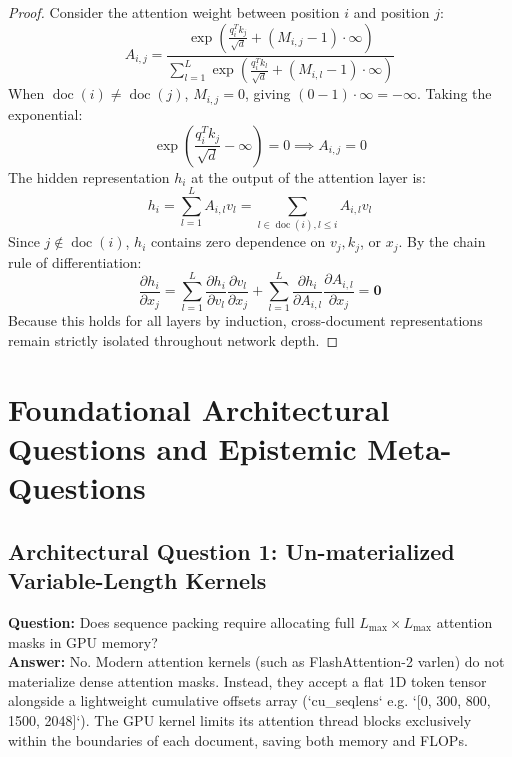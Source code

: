 \documentclass[11pt,a4paper]{article}
\theoremstyle{definition}
\begin{document}
\begin{proof}
Consider the attention weight between position $i$ and position $j$:
{\boldmath
\begin{equation}
A_{i, j} = \frac{\exp\left( \frac{q_i^T k_j}{\sqrt{d}} + (M_{i, j} - 1) \cdot \infty \right)}{\sum_{l=1}^L \exp\left( \frac{q_i^T k_l}{\sqrt{d}} + (M_{i, l} - 1) \cdot \infty \right)}
\end{equation}
}
When $\operatorname{doc}(i) \neq \operatorname{doc}(j)$, $M_{i, j} = 0$, giving $(0 - 1) \cdot \infty = -\infty$.
Taking the exponential:
{\boldmath
\begin{equation}
\exp\left( \frac{q_i^T k_j}{\sqrt{d}} - \infty \right) = 0 \implies A_{i, j} = 0
\end{equation}
}
The hidden representation $h_i$ at the output of the attention layer is:
{\boldmath
\begin{equation}
h_i = \sum_{l=1}^L A_{i, l} v_l = \sum_{l \in \operatorname{doc}(i), l \le i} A_{i, l} v_l
\end{equation}
}
Since $j \notin \operatorname{doc}(i)$, $h_i$ contains zero dependence on $v_j, k_j$, or $x_j$.
By the chain rule of differentiation:
{\boldmath
\begin{equation}
\frac{\partial h_i}{\partial x_j} = \sum_{l=1}^L \frac{\partial h_i}{\partial v_l} \frac{\partial v_l}{\partial x_j} + \sum_{l=1}^L \frac{\partial h_i}{\partial A_{i, l}} \frac{\partial A_{i, l}}{\partial x_j} = \mathbf{0}
\end{equation}
}
Because this holds for all layers by induction, cross-document representations remain strictly isolated throughout network depth.
\end{proof}

\section{Foundational Architectural Questions and Epistemic Meta-Questions}

\subsection{Architectural Question 1: Un-materialized Variable-Length Kernels}
\textbf{Question:} Does sequence packing require allocating full $L_{\max} \times L_{\max}$ attention masks in GPU memory?\\
\textbf{Answer:} No. Modern attention kernels (such as FlashAttention-2 varlen) do not materialize dense attention masks. Instead, they accept a flat 1D token tensor alongside a lightweight cumulative offsets array (`cu_seqlens` e.g. `[0, 300, 800, 1500, 2048]`). The GPU kernel limits its attention thread blocks exclusively within the boundaries of each document, saving both memory and FLOPs.
\end{document}
